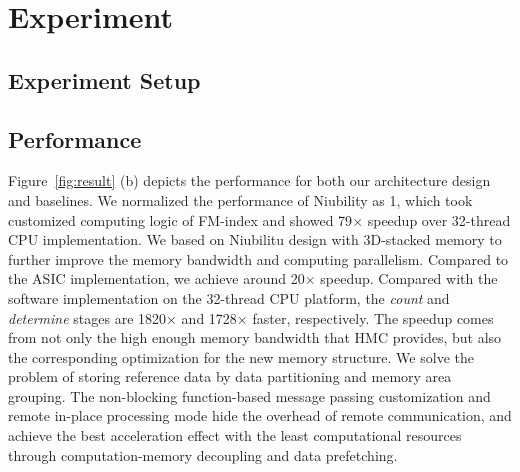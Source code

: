 \documentclass[9pt,conference]{IEEEtran}
\begin{document}
\section{Experiment}
\subsection{Experiment Setup}
\subsection{Performance}
Figure~\ref{fig:result} (b) depicts the performance for both our architecture design and baselines. We normalized the performance of Niubility as 1, which took customized computing logic of FM-index and showed 79$\times$ speedup over 32-thread CPU implementation. We based on Niubilitu design with 3D-stacked memory to further improve the memory bandwidth and computing parallelism. Compared to the ASIC implementation, we achieve around 20$\times$ speedup. Compared with the software implementation on the 32-thread CPU platform, the \textit{count} and \textit{determine} stages are 1820$\times$ and 1728$\times$ faster, respectively. The speedup comes from not only the high enough memory bandwidth that HMC provides, but also the corresponding optimization for the new memory structure. We solve the problem of storing reference data by data partitioning and memory area grouping. The non-blocking function-based message passing customization and remote in-place processing mode hide the overhead of remote communication, and achieve the best acceleration effect with the least computational resources through computation-memory decoupling and data prefetching.
\end{document}
